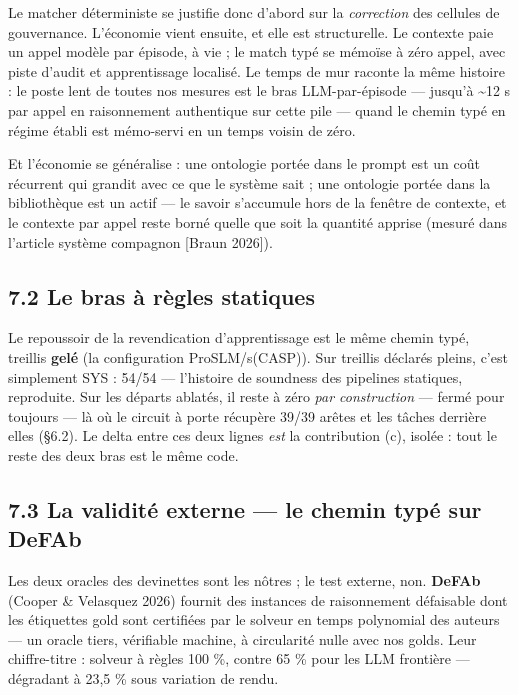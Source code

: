 \documentclass[11pt]{article}
\begin{document}
Le matcher déterministe se justifie donc d'abord sur la \emph{correction} des cellules de gouvernance. L'économie vient ensuite, et elle est structurelle. Le contexte paie un appel modèle par épisode, à vie ; le match typé se mémoïse à zéro appel, avec piste d'audit et apprentissage localisé. Le temps de mur raconte la même histoire : le poste lent de toutes nos mesures est le bras LLM-par-épisode — jusqu'à \textasciitilde{}12 s par appel en raisonnement authentique sur cette pile — quand le chemin typé en régime établi est mémo-servi en un temps voisin de zéro.

Et l'économie se généralise : une ontologie portée dans le prompt est un coût récurrent qui grandit avec ce que le système sait ; une ontologie portée dans la bibliothèque est un actif — le savoir s'accumule hors de la fenêtre de contexte, et le contexte par appel reste borné quelle que soit la quantité apprise (mesuré dans l'article système compagnon [Braun 2026]).

\subsection*{7.2 Le bras à règles statiques}

Le repoussoir de la revendication d'apprentissage est le même chemin typé, treillis \textbf{gelé} (la configuration ProSLM/s(CASP)). Sur treillis déclarés pleins, c'est simplement SYS : 54/54 — l'histoire de soundness des pipelines statiques, reproduite. Sur les départs ablatés, il reste à zéro \emph{par construction} — fermé pour toujours — là où le circuit à porte récupère 39/39 arêtes et les tâches derrière elles (§6.2). Le delta entre ces deux lignes \emph{est} la contribution (c), isolée : tout le reste des deux bras est le même code.

\subsection*{7.3 La validité externe — le chemin typé sur DeFAb}

Les deux oracles des devinettes sont les nôtres ; le test externe, non. \textbf{DeFAb} (Cooper \& Velasquez 2026) fournit des instances de raisonnement défaisable dont les étiquettes gold sont certifiées par le solveur en temps polynomial des auteurs — un oracle tiers, vérifiable machine, à circularité nulle avec nos golds. Leur chiffre-titre : solveur à règles 100 \%, contre 65 \% pour les LLM frontière — dégradant à 23,5 \% sous variation de rendu.
\end{document}

